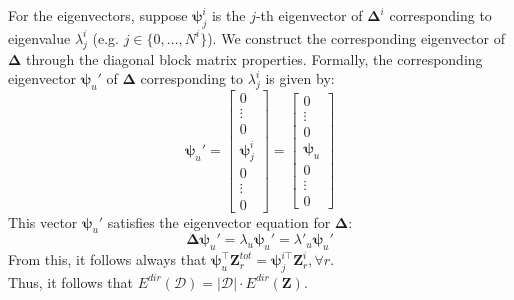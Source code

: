 \documentclass[twoside]{article}
\theoremstyle{definition}
\begin{document}
For the eigenvectors, suppose $\bm{\psi}_j^i$ is the $j$-th eigenvector of $\mathbf{\Delta}^i$ corresponding to eigenvalue \( \lambda_j^i \) (e.g. $j \in \{0, \ldots, N^i\}$). We construct the corresponding eigenvector of $\mathbf{\Delta}$ through the diagonal block matrix properties. Formally, the corresponding eigenvector $\bm{\psi}_u'$ of $\mathbf{\Delta}$ corresponding to \( \lambda_j^i \) is given by:
\[
\bm{\psi}_u' = \begin{bmatrix}
0 \\
\vdots \\
0 \\
\bm{\psi}_j^{i} \\
0 \\
\vdots \\
0
\end{bmatrix} = \begin{bmatrix}
0 \\
\vdots \\
0 \\
\bm{\psi}_u \\
0 \\
\vdots \\
0
\end{bmatrix}
\]
This vector $\bm{\psi}_u'$ satisfies the eigenvector equation for $\mathbf{\Delta}$:
\[
\mathbf{\Delta} \bm{\psi}_u' = \lambda_u \bm{\psi}_u' = \lambda'_u \bm{\psi}_u'
\]
From this, it follows always that $\bm{\psi}_u^{\top} \mathbf{Z}^{tot}_{r} = \bm{\psi}_j^{i\top} \mathbf{Z}^{i}_{r}, \forall r$. \\Thus, it follows that $E^{dir}(\mathcal{D}) = |\mathcal{D}| \cdot E^{dir}(\mathbf{Z})$.
\end{document}
